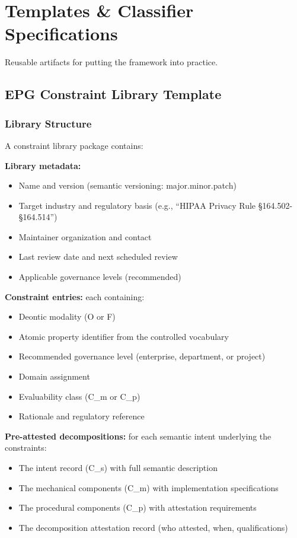 \chapter{Templates \& Classifier Specifications}
\label{ch:templates}


Reusable artifacts for putting the framework into practice.

\section{EPG Constraint Library Template}
\label{sec:templates-C-1}


\subsection{Library Structure}
\label{sec:templates-C-1-1}


A constraint library package contains:

\textbf{Library metadata:}
\begin{itemize}
  \item Name and version (semantic versioning: major.minor.patch)
  \item Target industry and regulatory basis (e.g., ``HIPAA Privacy Rule \S{}164.502-\S{}164.514'')
  \item Maintainer organization and contact
  \item Last review date and next scheduled review
  \item Applicable governance levels (recommended)
\end{itemize}


\textbf{Constraint entries:} each containing:
\begin{itemize}
  \item Deontic modality (O or F)
  \item Atomic property identifier from the controlled vocabulary
  \item Recommended governance level (enterprise, department, or project)
  \item Domain assignment
  \item Evaluability class (C\_\allowbreak{}m or C\_\allowbreak{}p)
  \item Rationale and regulatory reference
\end{itemize}


\textbf{Pre-attested decompositions:} for each semantic intent underlying the constraints:
\begin{itemize}
  \item The intent record (C\_\allowbreak{}s) with full semantic description
  \item The mechanical components (C\_\allowbreak{}m) with implementation specifications
  \item The procedural components (C\_\allowbreak{}p) with attestation requirements
  \item The decomposition attestation record (who attested, when, qualifications)
\end{itemize}



